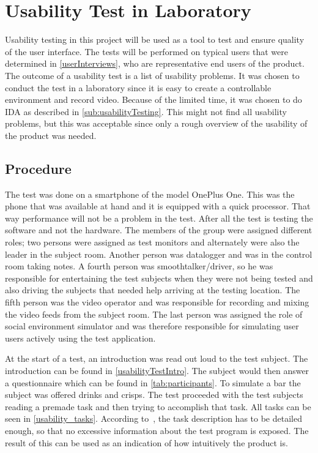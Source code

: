 \section{Usability Test in Laboratory}
Usability testing in this project will be used as a tool to test and
ensure quality of the user interface. The tests will be performed on
typical users that were determined in \cref{userInterviews}, who are
representative end users of the product. The outcome of a usability
test is a list of usability problems. It was chosen to conduct the
test in a laboratory since it is easy to create a controllable
environment and record video. Because of the limited time, it was
chosen to do IDA as described in \cref{sub:usabilityTesting}. This
might not find all usability problems, but this was acceptable since
only a rough overview of the usability of the product was needed.

\subsection{Procedure}
The test was done on a smartphone of the model OnePlus One. This was
the phone that was available at hand and it is equipped with a quick
processor. That way performance will not be a problem in the
test. After all the test is testing the software and not the
hardware. The members of the group were assigned different roles; two
persons were assigned as test monitors and alternately were also the
leader in the subject room. Another person was datalogger and was in
the control room taking notes. A fourth person was
smoothtalker/driver, so he was responsible for entertaining the test
subjects when they were not being tested and also driving the subjects
that needed help arriving at the testing location. The fifth person
was the video operator and was responsible for recording and mixing
the video feeds from the subject room. The last person was assigned
the role of social environment simulator and was therefore responsible
for simulating user users actively using the test application.

At the start of a test, an introduction was read out loud to the test
subject. The introduction can be found in
\cref{usabilityTestIntro}. The subject would then answer a
questionnaire which can be found in \cref{tab:participants}. To
simulate a bar the subject was offered drinks and crisps. The test
proceeded with the test subjects reading a premade task and then
trying to accomplish that task. All tasks can be seen in \cref{usability_tasks}. According to~\cite{RubinChisnellSpool08}, the task description has to be detailed enough, so that no excessive information about the test program is exposed. The result of this can be used as an indication of how intuitively the product is.

